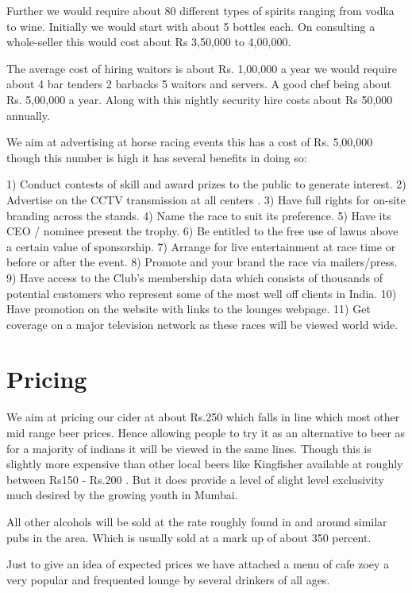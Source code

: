 \documentclass{article}
\begin{document}
Further we would require about 80 different types of spirits ranging from vodka to wine. Initially we would start with about 5 bottles each. On consulting a whole-seller this would cost about Rs 3,50,000 to 4,00,000.

The average cost of hiring waitors is about Rs. 1,00,000 a year we would require about 4 bar tenders 2 barbacks 5 waitors and servers.
A good chef being about Rs. 5,00,000 a year.
Along with this nightly security hire costs about Rs 50,000 annually.

We aim at advertising at horse racing events this has a cost of Rs. 5,00,000 though this number is high it has several benefits in doing so:

1) Conduct contests of skill and award prizes to the public to generate interest.
2) Advertise on the CCTV transmission at all centers .
3) Have full rights for on-site branding across the stands.
4) Name the race to suit its preference.
5) Have its CEO / nominee present the trophy.
6) Be entitled to the free use of lawns above a certain value of sponsorship.
7) Arrange for live entertainment at race time or before or after the event.
8) Promote and your brand the race via mailers/press.
9) Have access to the Club's membership data which consists of thousands of potential customers who represent some of the most well off clients in India.
10) Have promotion on the website with links to the lounges webpage.
11) Get coverage on a major television network as these races will be viewed world wide.



\section{Pricing}
We aim at pricing our cider at about Rs.250 which falls in line which most other mid range beer prices. Hence allowing people to try it as an alternative to beer as for a majority of indians it will be viewed in the same lines. Though this is slightly more expensive than other local beers like Kingfisher available at roughly between Rs150 - Rs.200 . But it does provide a level of slight level exclusivity much desired by the growing youth in Mumbai.

All other alcohols will be sold at the rate roughly found in and around similar pubs in the area. Which is usually sold at a mark up of about 350 percent.

Just to give an idea of expected prices we have attached a menu of cafe zoey a very popular and frequented lounge by several drinkers of all ages.
\end{document}
